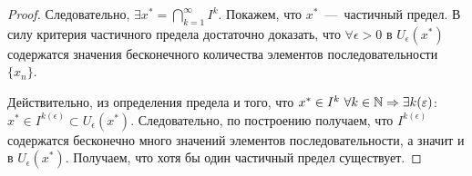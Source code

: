 \begin{proof}
    Следовательно, $\displaystyle \exists x^{*} = \bigcap_{k = 1}^{\infty} I^{k}$. Покажем, что $x^{*}$~---~частичный предел. В силу критерия частичного предела достаточно доказать, что $\forall \epsilon > 0$ в $U_{\epsilon} (x^{*})$ содержатся значения бесконечного количества элементов последовательности $\{ x_{n} \}$.

    Действительно, из определения предела и того, что $x^{*} \in I^{k} \  \forall k \in \mathbb{N} \Rightarrow \exists k (\varepsilon)$: $x^{*} \in I^{k (\epsilon)} \subset U_{\epsilon} (x^{*})$. Следовательно, по построению получаем, что $I^{k (\epsilon)}$ содержатся бесконечно много значений элементов последовательности, а значит и в $U_{\epsilon} (x^{*}).$ Получаем, что хотя бы один частичный предел существует.
\end{proof}